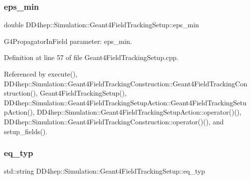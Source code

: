 \hypertarget{struct_d_d4hep_1_1_simulation_1_1_geant4_field_tracking_setup_afc80b1b5d836629561e474b3f2e501e5}{}\label{struct_d_d4hep_1_1_simulation_1_1_geant4_field_tracking_setup_afc80b1b5d836629561e474b3f2e501e5} 
\subsubsection{\texorpdfstring{eps\+\_\+min}{eps\_min}}
{\footnotesize\ttfamily double D\+D4hep\+::\+Simulation\+::\+Geant4\+Field\+Tracking\+Setup\+::eps\+\_\+min\hspace{0.3cm}{\ttfamily [protected]}}



G4\+Propagator\+In\+Field parameter\+: eps\+\_\+min. 



Definition at line 57 of file Geant4\+Field\+Tracking\+Setup.\+cpp.



Referenced by execute(), D\+D4hep\+::\+Simulation\+::\+Geant4\+Field\+Tracking\+Construction\+::\+Geant4\+Field\+Tracking\+Construction(), Geant4\+Field\+Tracking\+Setup(), D\+D4hep\+::\+Simulation\+::\+Geant4\+Field\+Tracking\+Setup\+Action\+::\+Geant4\+Field\+Tracking\+Setup\+Action(), D\+D4hep\+::\+Simulation\+::\+Geant4\+Field\+Tracking\+Setup\+Action\+::operator()(), D\+D4hep\+::\+Simulation\+::\+Geant4\+Field\+Tracking\+Construction\+::operator()(), and setup\+\_\+fields().

\hypertarget{struct_d_d4hep_1_1_simulation_1_1_geant4_field_tracking_setup_aade0e19505a1c090a549c923b079ca56}{}\label{struct_d_d4hep_1_1_simulation_1_1_geant4_field_tracking_setup_aade0e19505a1c090a549c923b079ca56} 
\subsubsection{\texorpdfstring{eq\+\_\+typ}{eq\_typ}}
{\footnotesize\ttfamily std\+::string D\+D4hep\+::\+Simulation\+::\+Geant4\+Field\+Tracking\+Setup\+::eq\+\_\+typ\hspace{0.3cm}{\ttfamily [protected]}}



